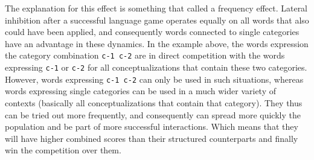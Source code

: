 The explanation for this effect is something that
\cite{debeule06compositionality} called a frequency effect. Lateral
inhibition after a successful language game operates equally on all
words that also could have been applied, and consequently words
connected to single categories have an advantage in these dynamics. In
the example above, the words expression the category combination
\texttt{c-1 c-2} are in direct competition with the words expressing
\texttt{c-1} or \texttt{c-2} for all conceptualizations that contain
these two categories. However, words expressing \texttt{c-1 c-2} can
only be used in such situations, whereas words expressing single
categories can be used in a much wider variety of contexts (basically
all conceptualizations that contain that category). They thus can be
tried out more frequently, and consequently can spread more quickly
the population and be part of more successful interactions. Which
means that they will have higher combined scores than their structured
counterparts and finally win the competition over them.




